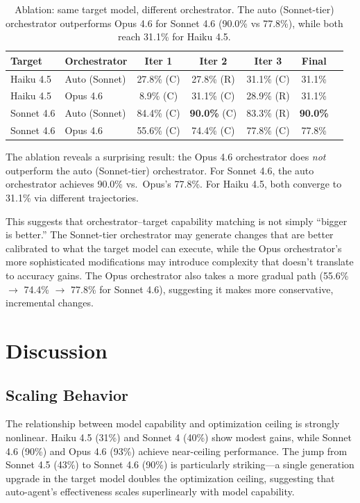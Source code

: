 \documentclass[11pt,a4paper]{article}
\begin{document}
\begin{table}[h]
\centering
\begin{tabular}{llccccc}
\toprule
\textbf{Target} & \textbf{Orchestrator} & \textbf{Iter 1} & \textbf{Iter 2} & \textbf{Iter 3} & \textbf{Final} \\
\midrule
Haiku 4.5 & Auto (Sonnet) & 27.8\% (C) & 27.8\% (R) & 31.1\% (C) & 31.1\% \\
Haiku 4.5 & Opus 4.6 & 8.9\% (C) & 31.1\% (C) & 28.9\% (R) & 31.1\% \\
\midrule
Sonnet 4.6 & Auto (Sonnet) & 84.4\% (C) & \textbf{90.0\%} (C) & 83.3\% (R) & \textbf{90.0\%} \\
Sonnet 4.6 & Opus 4.6 & 55.6\% (C) & 74.4\% (C) & 77.8\% (C) & 77.8\% \\
\bottomrule
\end{tabular}
\caption{Ablation: same target model, different orchestrator. The auto (Sonnet-tier) orchestrator outperforms Opus 4.6 for Sonnet 4.6 (90.0\% vs 77.8\%), while both reach 31.1\% for Haiku 4.5.}
\label{tab:ablation}
\end{table}

The ablation reveals a surprising result: the Opus 4.6 orchestrator does \emph{not} outperform the auto (Sonnet-tier) orchestrator. For Sonnet 4.6, the auto orchestrator achieves 90.0\% vs.\ Opus's 77.8\%. For Haiku 4.5, both converge to 31.1\% via different trajectories.

This suggests that orchestrator--target capability matching is not simply ``bigger is better.'' The Sonnet-tier orchestrator may generate changes that are better calibrated to what the target model can execute, while the Opus orchestrator's more sophisticated modifications may introduce complexity that doesn't translate to accuracy gains. The Opus orchestrator also takes a more gradual path (55.6\% $\rightarrow$ 74.4\% $\rightarrow$ 77.8\% for Sonnet 4.6), suggesting it makes more conservative, incremental changes.

\section{Discussion}

\subsection{Scaling Behavior}

The relationship between model capability and optimization ceiling is strongly nonlinear. Haiku 4.5 (31\%) and Sonnet 4 (40\%) show modest gains, while Sonnet 4.6 (90\%) and Opus 4.6 (93\%) achieve near-ceiling performance. The jump from Sonnet 4.5 (43\%) to Sonnet 4.6 (90\%) is particularly striking---a single generation upgrade in the target model doubles the optimization ceiling, suggesting that auto-agent's effectiveness scales superlinearly with model capability.
\end{document}
